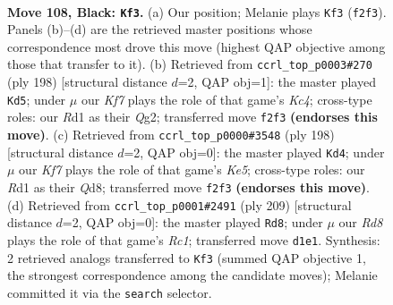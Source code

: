 \documentclass[11pt]{article}
\begin{document}
\clearpage

\begin{figure}[p]\centering
\begin{subfigure}{0.46\textwidth}\centering
\resizebox{\linewidth}{!}{%
\newchessgame
\chessboard[
  setfen={8/8/8/8/7K/8/5k2/3r4 b - - 1 108},
  showmover=false,
  pgfstyle=straightmove, color=movearrow, markmove={f2-f3}
]}
\caption{}
\end{subfigure}\hfill
\begin{subfigure}{0.46\textwidth}\centering
\resizebox{\linewidth}{!}{%
\newchessgame
\chessboard[
  setfen={8/8/1k6/8/2K5/8/6Q1/8 w - - 1 100},
  showmover=false,
  pgfstyle=straightmove, color=movearrow, markmove={c4-d5}
]}
\caption{}
\end{subfigure}
\\[4pt]
\begin{subfigure}{0.46\textwidth}\centering
\resizebox{\linewidth}{!}{%
\newchessgame
\chessboard[
  setfen={3Q4/8/8/4K3/1k6/8/8/8 w - - 0 100},
  showmover=false,
  pgfstyle=straightmove, color=movearrow, markmove={e5-d4}
]}
\caption{}
\end{subfigure}\hfill
\begin{subfigure}{0.46\textwidth}\centering
\resizebox{\linewidth}{!}{%
\newchessgame
\chessboard[
  setfen={2r5/4k3/8/8/K7/8/3N4/8 b - - 5 105},
  showmover=false,
  pgfstyle=straightmove, color=movearrow, markmove={c8-d8}
]}
\caption{}
\end{subfigure}
\caption{\textbf{Move 108, Black: \texttt{Kf3}.} (a) Our position; Melanie plays \texttt{Kf3} (\texttt{f2f3}). Panels (b)--(d) are the retrieved master positions whose correspondence most drove this move (highest QAP objective among those that transfer to it). (b) Retrieved from \texttt{ccrl\_top\_p0003\#270} (ply 198) [structural distance $d$=2, QAP obj=1]: the master played \texttt{Kd5}; under $\mu$ our \emph{Kf7} plays the role of that game's \emph{Kc4}; cross-type roles: our \emph{R}d1 as their \emph{Q}g2; transferred move \texttt{f2f3} \textbf{(endorses this move)}. (c) Retrieved from \texttt{ccrl\_top\_p0000\#3548} (ply 198) [structural distance $d$=2, QAP obj=0]: the master played \texttt{Kd4}; under $\mu$ our \emph{Kf7} plays the role of that game's \emph{Ke5}; cross-type roles: our \emph{R}d1 as their \emph{Q}d8; transferred move \texttt{f2f3} \textbf{(endorses this move)}. (d) Retrieved from \texttt{ccrl\_top\_p0001\#2491} (ply 209) [structural distance $d$=2, QAP obj=0]: the master played \texttt{Rd8}; under $\mu$ our \emph{Rd8} plays the role of that game's \emph{Rc1}; transferred move \texttt{d1e1}. Synthesis: 2 retrieved analogs transferred to \texttt{Kf3} (summed QAP objective 1, the strongest correspondence among the candidate moves); Melanie committed it via the \texttt{search} selector.}
\label{fig:thought-m215}
\end{figure}
\end{document}
